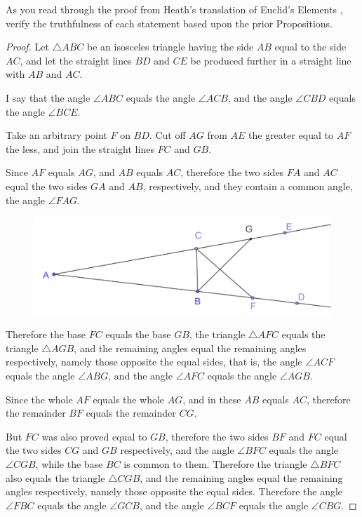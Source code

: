 \documentclass[
]{book}
\theoremstyle{definition}
\theoremstyle{definition}
\theoremstyle{definition}
\theoremstyle{definition}
\theoremstyle{remark}
\begin{document}
As you read through the proof from Heath's translation of Euclid's Elements \citeyearpar[p.~251]{Heath1908_1}, verify the truthfulness of each statement based upon the prior Propositions.

\begin{proof}

Let \(\triangle ABC\) be an isosceles triangle having the side \(AB\) equal to the side \(AC\), and let the straight lines \(BD\) and \(CE\) be produced further in a straight line with \(AB\) and \(AC\).

I say that the angle \(\angle ABC\) equals the angle \(\angle ACB\), and the angle \(\angle CBD\) equals the angle \(\angle BCE\).

Take an arbitrary point \(F\) on \(BD\). Cut off \(AG\) from \(AE\) the greater equal to \(AF\) the less, and join the straight lines \(FC\) and \(GB\).

Since \(AF\) equals \(AG\), and \(AB\) equals \(AC\), therefore the two sides \(FA\) and \(AC\) equal the two sides \(GA\) and \(AB\), respectively, and they contain a common angle, the angle \(\angle FAG\).

\begin{figure}

{\centering \includegraphics[width=0.7\linewidth]{images/Prop5} 

}

\end{figure}

Therefore the base \(FC\) equals the base \(GB\), the triangle \(\triangle AFC\) equals the triangle \(\triangle AGB\), and the remaining angles equal the remaining angles respectively, namely those opposite the equal sides, that is, the angle \(\angle ACF\) equals the angle \(\angle ABG\), and the angle \(\angle AFC\) equals the angle \(\angle AGB\).

Since the whole \(AF\) equals the whole \(AG\), and in these \(AB\) equals \(AC\), therefore the remainder \(BF\) equals the remainder \(CG\).

But \(FC\) was also proved equal to \(GB\), therefore the two sides \(BF\) and \(FC\) equal the two sides \(CG\) and \(GB\) respectively, and the angle \(\angle BFC\) equals the angle \(\angle CGB\), while the base \(BC\) is common to them. Therefore the triangle \(\triangle BFC\) also equals the triangle \(\triangle CGB\), and the remaining angles equal the remaining angles respectively, namely those opposite the equal sides. Therefore the angle \(\angle FBC\) equals the angle \(\angle GCB\), and the angle \(\angle BCF\) equals the angle \(\angle CBG\).


\end{proof}
\end{document}
